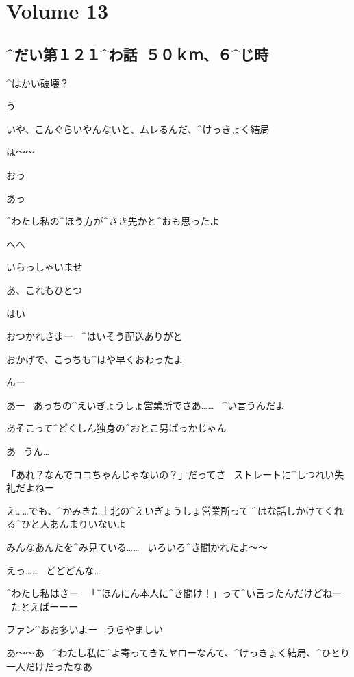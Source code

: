 \section{Volume 13}

\subsection{^{だい}{第}１２１^{わ}{話}\ ５０ｋｍ、６^{じ}{時}}

\page[5]
\Makki ^{はかい}{破壊}？

\Alpha う

\Alpha いや、こんぐらいやんないと、ムレるんだ、^{けっきょく}{結局}

\Makki ほ〜〜

\page[7]
\Shiba おっ

\Kokone あっ

\Shiba ^{わたし}{私}の^{ほう}{方}が^{さき}{先}かと^{おも}{思}ったよ

\Kokone へへ

\Person いらっしゃいませ

\Shiba あ、これもひとつ

\Person はい

\page[8]
\Kokone おつかれさまー
\ ^{はいそう}{配送}ありがと

\Kokone おかげで、こっちも^{はや}{早}くおわったよ

\Shiba んー

\Shiba あー
\ あっちの^{えいぎょうしょ}{営業所}でさあ……
\ ^{い}{言}うんだよ

\Shiba あそこって^{どくしん}{独身}の^{おとこ}{男}ばっかじゃん

\Kokone あ
\ うん…

\Shiba 「あれ？なんでココちゃんじゃないの？」だってさ
\ ストレートに^{しつれい}{失礼}だよねー

\page[9]
\Kokone え……でも、^{かみきた}{上北}の^{えいぎょうしょ}{営業所}って
^{はな}{話}しかけてくれる^{ひと}{人}あんまりいないよ

\Shiba みんなあんたを^{み}{見}ている……
\ いろいろ^{き}{聞}かれたよ〜〜

\Kokone えっ……
\ どどどんな…

\Shiba ^{わたし}{私}はさー
\ 「^{ほんにん}{本人}に^{き}{聞}け！」って^{い}{言}ったんだけどねー
\ たとえばーーー

\page[10]
\Shiba ファン^{おお}{多}いよー
\ うらやましい

\Shiba あ〜〜あ
\ ^{わたし}{私}に^{よ}{寄}ってきたヤローなんて、^{けっきょく}{結局}、^{ひとり}{一人}だけだったなあ

